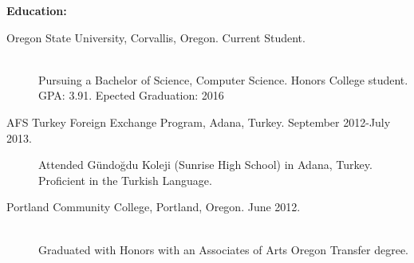 \documentclass[11pt]{article}
\begin{document}
{\Large \bf Education:}
\begin{description}
	\item[Oregon State University, Corvallis, Oregon.
		\hfill Current Student.]
		\hfill \\
		Pursuing a Bachelor of Science, Computer Science. 
		Honors College student. GPA: 3.91. Epected Graduation: 2016
		
	\item[AFS Turkey Foreign Exchange Program, Adana, Turkey. 
		\hfill September 2012-July 2013.]
		Attended Gündoğdu Koleji (Sunrise High School) in Adana, 
		Turkey. Proficient in the Turkish Language.

	\item[Portland Community College, Portland, Oregon.
		\hfill June 2012.]
		\hfill \\
		Graduated with Honors with an Associates of Arts 
		Oregon Transfer degree.

\end{description}
\end{document}
